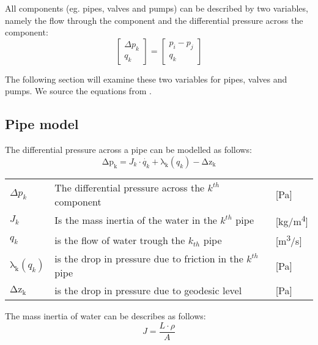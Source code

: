 All components (eg. pipes, valves and pumps) can be described by two variables, namely the flow through the component and the differential pressure across the component:
\begin{equation}
\begin{bmatrix} \Delta{p_{k}} \\ q_{k} \end{bmatrix} = 
\begin{bmatrix} p_{i} - p_{j} \\ q_{k} \end{bmatrix}    
\end{equation}

The following section will examine these two variables for pipes, valves and pumps. We source the equations from \cite{Swamee2008}.

\subsection{Pipe model}\label{subsec:PipeModel}
The differential pressure across a pipe can be modelled as follows:
\begin{equation}
    \mathrm{\Delta{p_{k}}} = J_{k}\cdot\dot{q_{k}}+\mathrm{\lambda_{k}}(q_{k})-\mathrm{\Delta{z_{k}}}
    \label{eq:Delta_p_pipe}
\end{equation}


	\begin{center}
		\begin{tabular}{l p{10cm} l}
			
			$\Delta{p_{k}}$ & The differential pressure across the $k^{th}$ component & [\si{Pa}]\\ 
		  	${J_{k}}$ & Is the mass inertia of the water in the $k^{th}$ pipe & [\si{kg}/\si{m^{4}}] \\
		  	$q_{k}$ & is the flow of water trough the $k_{th}$ pipe & [{\si{\meter\cubed}/\si{s}}] \\
		  	$\mathrm{\lambda_{k}}(q_{k})$ & is the drop in pressure due to friction in the $k^{th}$ pipe & [\si{Pa}] \\
		  	$\mathrm{\Delta{z_{k}}}$ & is the drop in pressure due to geodesic level & [\si{Pa}]\\
			\end{tabular}
	\end{center}

The mass inertia of water can be describes as follows:
\begin{equation}
	J= \frac{L\cdot \rho}{A}
\end{equation}

